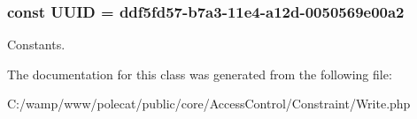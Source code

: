 \subsubsection[{U\+U\+I\+D}]{\setlength{\rightskip}{0pt plus 5cm}const U\+U\+I\+D = \textquotesingle{}ddf5fd57-\/b7a3-\/11e4-\/a12d-\/0050569e00a2\textquotesingle{}}\label{class_able_polecat___access_control___constraint___write_a74b892c8c0b86bf9d04c5819898c51e7}
Constants. 

The documentation for this class was generated from the following file\+:\begin{DoxyCompactItemize}
\item 
C\+:/wamp/www/polecat/public/core/\+Access\+Control/\+Constraint/Write.\+php\end{DoxyCompactItemize}
